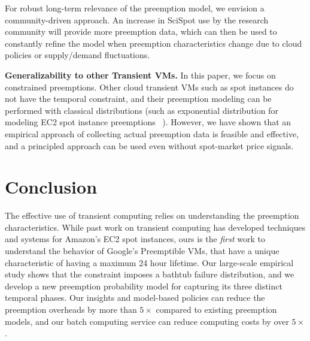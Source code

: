 \documentclass[compsoc]{IEEEtran}
\begin{document}
For robust long-term relevance of the preemption model, we envision a community-driven approach.
An increase in SciSpot use by the research community will provide more preemption data, which can then be used to constantly refine the model when preemption characteristics change due to cloud policies or supply/demand fluctuations. 

\noindent \textbf{Generalizability to other Transient VMs.}
In this paper, we focus on constrained preemptions.
Other cloud transient VMs such as spot instances do not have the temporal constraint, and their preemption modeling can be performed with classical distributions (such as exponential distribution for modeling EC2 spot instance preemptions ~\cite{bid-cloud, flint, hotcloud-not-bid}). 
However, we have shown that an empirical approach of collecting actual preemption data is feasible and effective, and a principled approach can be used even without spot-market price signals. 







 

 \section{Conclusion}
 \label{sec:conclusion}


 The effective use of transient computing relies on understanding the preemption characteristics.
While past work on transient computing has developed techniques and systems for Amazon's EC2 spot instances, ours is the \emph{first} work to understand the behavior of Google's Preemptible VMs, that have a unique characteristic of having a maximum 24 hour lifetime.
Our large-scale empirical study shows that the constraint imposes a bathtub failure distribution, and we develop a new preemption probability model for capturing its three distinct temporal phases. 
Our insights and model-based policies can reduce the preemption overheads by more than $5\times$ compared to existing preemption models, and our batch computing service can reduce computing costs by over $5\times$. 






 



{


}
\end{document}
